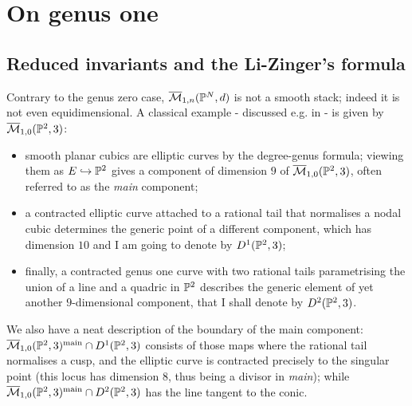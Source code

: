 \chapter{On genus one}\label{ch:hg}

\section{Reduced invariants and the Li-Zinger's formula}\label{sec:redinv}
Contrary to the genus zero case, $\overline{\mathcal{M}}_{1,n}(\mathbb P^N,d)$ is not a smooth stack; indeed it is not even equidimensional. A classical example - discussed e.g. in \cite{VZpreview} - is given by $\overline{\mathcal{M}}_{1,0}(\mathbb P^2,3)$:
\begin{itemize}
 \item smooth planar cubics are elliptic curves by the degree-genus formula; viewing them as $E\hookrightarrow \mathbb P^2$ gives a component of dimension $9$ of $\overline{\mathcal{M}}_{1,0}(\mathbb P^2,3)$, often referred to as the \emph{main} component;
 \item a contracted elliptic curve attached to a rational tail that normalises a nodal cubic determines the generic point of a different component, which has dimension $10$ and I am going to denote by $D^1(\mathbb P^2,3)$;
 \item finally, a contracted genus one curve with two rational tails parametrising the union of a line and a quadric in $\mathbb P^2$ describes the generic element of yet another $9$-dimensional component, that I shall denote by $D^2(\mathbb P^2,3)$.
\end{itemize}
We also have a neat description of the boundary of the main component: $\overline{\mathcal{M}}_{1,0}(\mathbb P^2,3)^{\mathrm{main}}\cap D^1(\mathbb P^2,3)$ consists of those maps where the rational tail normalises a cusp, and the elliptic curve is contracted precisely to the singular point (this locus has dimension $8$, thus being a divisor in \emph{main}); while $\overline{\mathcal{M}}_{1,0}(\mathbb P^2,3)^{\mathrm{main}}\cap D^2(\mathbb P^2,3)$ has the line tangent to the conic.

